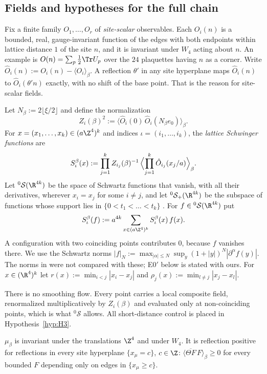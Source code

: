 \subsection{Fields and hypotheses for the full chain}\label{red:S-setting}

Fix a finite family $O_1,\dots,O_r$ of \emph{site-scalar} observables. Each $O_i(n)$ is a bounded, real, gauge-invariant function of the edges with both endpoints within lattice distance $1$ of the site $n$, and it is invariant under $W_4$ acting about $n$. An example is $O(n)=\sum_p\tfrac12\Tr U_p$ over the $24$ plaquettes having $n$ as a corner. Write $\hat O_i(n):=O_i(n)-\langle O_i\rangle_\beta$. A reflection $\theta'$ in any site hyperplane maps $\hat O_i(n)$ to $\hat O_i(\theta'n)$ exactly, with no shift of the base point. That is the reason for site-scalar fields.

Let $N_\beta:=2\lfloor\xi/2\rfloor$ and define the normalization
\[
  Z_i(\beta)^2:=\langle\hat O_i(0)\,\hat O_i(N_\beta e_0)\rangle_\beta .
\]
For $x=(x_1,\dots,x_k)\in(a\Z^4)^k$ and indices $\iota=(i_1,\dots,i_k)$, the \emph{lattice Schwinger functions} are
\begin{equation}\label{red:Sbeta}
  S^\beta_\iota(x):=\prod_{j=1}^k Z_{i_j}(\beta)^{-1}\,\Bigl\langle\prod_{j=1}^k\hat O_{i_j}(x_j/a)\Bigr\rangle_\beta .
\end{equation}
Let ${}^0\mathcal S(\R^{4k})$ be the space of Schwartz functions that vanish, with all their derivatives, wherever $x_i=x_j$ for some $i\ne j$, and let ${}^0\mathcal S_+(\R^{4k})$ be the subspace of functions whose support lies in $\{0<t_1<\dots<t_k\}$ \cite[eq.~(2.25)]{KQR21}. For $f\in{}^0\mathcal S(\R^{4k})$ put
\[
  S^\beta_\iota(f):=a^{4k}\sum_{x\in(a\Z^4)^k}S^\beta_\iota(x)\,f(x).
\]
A configuration with two coinciding points contributes $0$, because $f$ vanishes there. We use the Schwartz norms $|f|_N:=\max_{|\alpha|\le N}\sup_y(1+|y|)^N|\partial^\alpha f(y)|$. The norms in \cite[eq.~(9.18)]{KQR21} were not compared with these; E0$'$ below is stated with ours. For $x\in(\R^4)^k$ let $r(x):=\min_{i<j}|x_i-x_j|$ and $\rho_j(x):=\min_{l\ne j}|x_j-x_l|$.

There is no smoothing flow. Every point carries a local composite field, renormalized multiplicatively by $Z_i(\beta)$ and evaluated only at non-coinciding points, which is what ${}^0\mathcal S$ allows. All short-distance control is placed in Hypothesis~\ref{hyp:H3}.

\begin{hypothesis}\label{hyp:H0}
$\mu_\beta$ is invariant under the translations $\Z^4$ and under $W_4$. It is reflection positive for reflections in every site hyperplane $\{x_\mu=c\}$, $c\in\Z$: $\langle\overline{\Theta F}\,F\rangle_\beta\ge0$ for every bounded $F$ depending only on edges in $\{x_\mu\ge c\}$.
\end{hypothesis}

